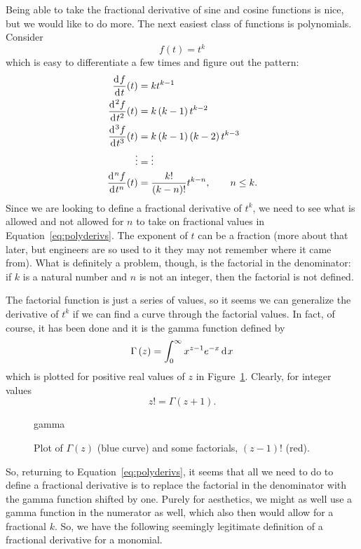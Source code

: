 Being able to take the fractional derivative of sine and cosine functions is nice, but we would like to do more. The next easiest class of functions is polynomials. Consider 
\begin{equation}
  f(t) = t^k
  \label{eq:poly}
\end{equation}
which is easy to differentiate a few times and figure out the pattern:
\begin{align}
  \frac{\operatorname{d}\hspace*{-1pt} f}{\operatorname{d}\hspace*{-1pt} t}(t) &= k t^{k-1} \\
  \frac{\operatorname{d}\hspace*{-1pt}^2 f}{\operatorname{d}\hspace*{-1pt} t^2}(t) &= k \left( k-1 \right) t^{k-2} \\
  \frac{\operatorname{d}\hspace*{-1pt}^3 f}{\operatorname{d}\hspace*{-1pt} t^3}(t) &= k \left( k-1 \right) \left( k - 2 \right) t^{k-3} \\
  \vdots &= \vdots \\
  \frac{\operatorname{d}\hspace*{-1pt}^n f}{\operatorname{d}\hspace*{-1pt} t^n}(t) &= \frac{k!}{\left( k - n \right)!} t^{k-n}, \qquad n \leq k.
  \label{eq:polyderivs}
\end{align}
Since we are looking to define a fractional derivative of $t^k$, we need to see what is allowed and not allowed for $n$ to take on fractional values in Equation~\ref{eq:polyderivs}. The exponent of $t$ can be a fraction (more about that later, but engineers are so used to it they may not remember where it came from). What is definitely a problem, though, is the factorial in the denominator: if $k$ is a natural number and $n$ is not an integer, then the factorial is not defined.

The factorial function is just a series of values, so it seems we can generalize the derivative of $t^k$ if we can find a curve through the factorial values. In fact, of course, it has been done and it is the gamma function defined by
\begin{equation}
  \Gamma\left(z\right) = \int_0^\infty x^{z - 1} e^{-x} \operatorname{d}\hspace*{-1pt} x
  \label{eq:gamma}
\end{equation}
which is plotted for positive real values of $z$ in Figure~\ref{fig:gamma}. Clearly, for integer values
\begin{equation}
  z! = \Gamma\left( z + 1 \right).
\end{equation}

\begin{figure}
  \centering
  {gamma}
  \caption{Plot of $\Gamma(z)$ (blue curve) and some factorials, $\left(z - 1\right)!$ (red).}
  \label{fig:gamma}
\end{figure}

So, returning to Equation~\ref{eq:polyderivs}, it seems that all we need to do to define a fractional derivative is to replace the factorial in the denominator with the gamma function shifted by one. Purely for aesthetics, we might as well use a gamma function in the numerator as well, which also then would allow for a fractional $k$. So, we have the following seemingly legitimate definition of a fractional derivative for a monomial.

